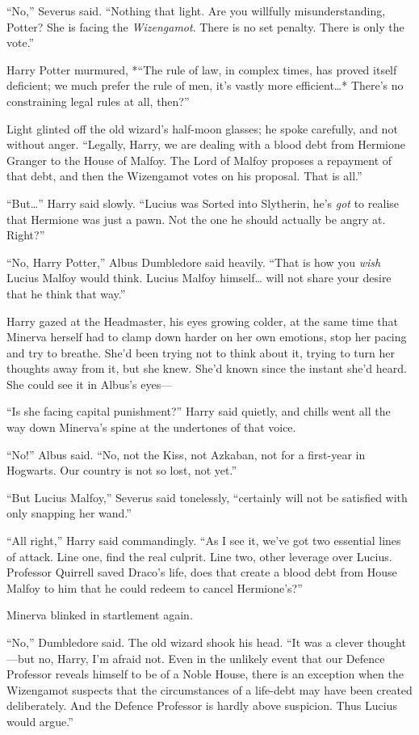 ``No,'' Severus said. ``Nothing that light. Are you willfully
misunderstanding, Potter? She is facing the \emph{Wizengamot}. There is
no set penalty. There is only the vote.''

Harry Potter murmured, *``The rule of law, in complex times, has proved
itself deficient; we much prefer the rule of men, it's vastly more
efficient\ldots{}* There's no constraining legal rules at all, then?''

Light glinted off the old wizard's half-moon glasses; he spoke
carefully, and not without anger. ``Legally, Harry, we are dealing with
a blood debt from Hermione Granger to the House of Malfoy. The Lord of
Malfoy proposes a repayment of that debt, and then the Wizengamot votes
on his proposal. That is all.''

``But\ldots{}'' Harry said slowly. ``Lucius was Sorted into Slytherin,
he's \emph{got} to realise that Hermione was just a pawn. Not the one he
should actually be angry at. Right?''

``No, Harry Potter,'' Albus Dumbledore said heavily. ``That is how you
\emph{wish} Lucius Malfoy would think. Lucius Malfoy himself\ldots{}
will not share your desire that he think that way.''

Harry gazed at the Headmaster, his eyes growing colder, at the same time
that Minerva herself had to clamp down harder on her own emotions, stop
her pacing and try to breathe. She'd been trying not to think about it,
trying to turn her thoughts away from it, but she knew. She'd known
since the instant she'd heard. She could see it in Albus's eyes---

``Is she facing capital punishment?'' Harry said quietly, and chills
went all the way down Minerva's spine at the undertones of that voice.

``No!'' Albus said. ``No, not the Kiss, not Azkaban, not for a
first-year in Hogwarts. Our country is not so lost, not yet.''

``But Lucius Malfoy,'' Severus said tonelessly, ``certainly will not be
satisfied with only snapping her wand.''

``All right,'' Harry said commandingly. ``As I see it, we've got two
essential lines of attack. Line one, find the real culprit. Line two,
other leverage over Lucius. Professor Quirrell saved Draco's life, does
that create a blood debt from House Malfoy to him that he could redeem
to cancel Hermione's?''

Minerva blinked in startlement again.

``No,'' Dumbledore said. The old wizard shook his head. ``It was a
clever thought---but no, Harry, I'm afraid not. Even in the unlikely
event that our Defence Professor reveals himself to be of a Noble House,
there is an exception when the Wizengamot suspects that the
circumstances of a life-debt may have been created deliberately. And the
Defence Professor is hardly above suspicion. Thus Lucius would argue.''

